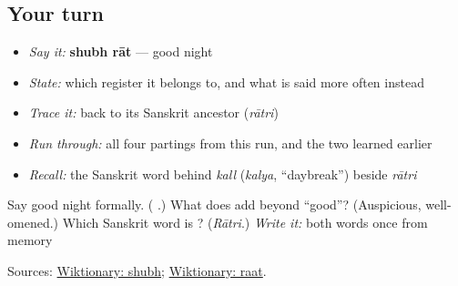 \subsection*{Your turn}
\begin{itemize}
\raggedright
  \item \emph{Say it:} \textbf{shubh rāt} — good night
  \item \emph{State:} which register it belongs to, and what is said more often instead
  \item \emph{Trace it:} \textbf{} back to its Sanskrit ancestor (\emph{rātri})
  \item \emph{Run through:} all four partings from this run, and the two learned earlier
  \item \emph{Recall:} the Sanskrit word behind \emph{kall} (\emph{kalya}, \textquotedblleft{}daybreak\textquotedblright{}) beside \emph{rātri}
\end{itemize}

\begin{tcolorbox}[breakable,colback=teal!4,colframe=teal!35!black,title={Before you move on}]
Say good night formally. (\textbf{ }.) What does \textbf{} add beyond \textquotedblleft{}good\textquotedblright{}? (Auspicious, well-omened.) Which Sanskrit word is \textbf{}? (\emph{Rātri}.) \emph{Write it:} both words once from memory

Sources: \href{https://en.wiktionary.org/wiki/\%E0\%A4\%B6\%E0\%A5\%81\%E0\%A4\%AD}{Wiktionary: shubh}; \href{https://en.wiktionary.org/wiki/\%E0\%A8\%B0\%E0\%A8\%BE\%E0\%A8\%A4}{Wiktionary: raat}.
\end{tcolorbox}
